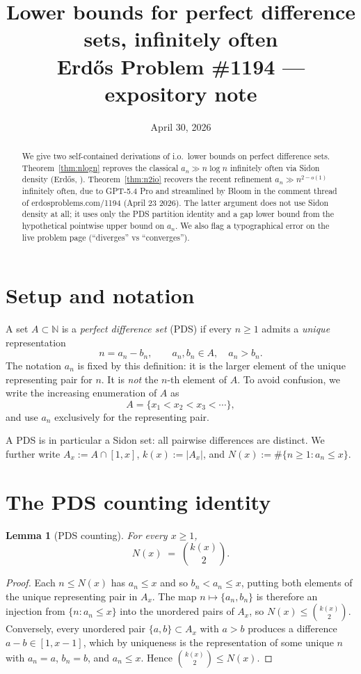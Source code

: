\documentclass[11pt]{article}
\title{Lower bounds for perfect difference sets, infinitely often \\
  \large Erd\H{o}s Problem \#1194 --- expository note}
\author{}
\date{April 30, 2026}
\newtheorem{lemma}{Lemma}
\begin{document}
\maketitle

\begin{abstract}
We give two self-contained derivations of i.o.\ lower bounds on
perfect difference sets. Theorem~\ref{thm:nlogn} reproves the classical
$a_n \gg n \log n$ infinitely often via Sidon density (Erd\H{o}s,
\cite{HaRo66}). Theorem~\ref{thm:n2io} recovers the recent refinement
$a_n \gg n^{2-o(1)}$ infinitely often, due to GPT-5.4 Pro and
streamlined by Bloom in the comment thread of erdosproblems.com/1194
(April 23 2026). The latter argument does not use Sidon density at all;
it uses only the PDS partition identity and a gap lower bound from
the hypothetical pointwise upper bound on $a_n$. We also flag a
typographical error on the live problem page (``diverges'' vs
``converges'').
\end{abstract}

\section{Setup and notation}\label{sec:setup}

A set $A \subset \mathbb{N}$ is a \emph{perfect difference set} (PDS) if
every $n \geq 1$ admits a \emph{unique} representation
\[
   n = a_n - b_n, \qquad a_n, b_n \in A, \quad a_n > b_n.
\]
The notation $a_n$ is fixed by this definition: it is the larger element
of the unique representing pair for $n$. It is \emph{not} the $n$-th
element of $A$. To avoid confusion, we write the increasing enumeration
of $A$ as
\[
   A = \{x_1 < x_2 < x_3 < \cdots\},
\]
and use $a_n$ exclusively for the representing pair.

A PDS is in particular a Sidon set: all pairwise differences are
distinct. We further write $A_x := A \cap [1, x]$, $k(x) := |A_x|$,
and $N(x) := \#\{n \geq 1 : a_n \leq x\}$.

\section{The PDS counting identity}\label{sec:counting}

\begin{lemma}[PDS counting]\label{lem:pds-count}
For every $x \geq 1$,
\[
   N(x) \;=\; \binom{k(x)}{2}.
\]
\end{lemma}

\begin{proof}
Each $n \leq N(x)$ has $a_n \leq x$ and so $b_n < a_n \leq x$, putting both
elements of the unique representing pair in $A_x$. The map
$n \mapsto \{a_n, b_n\}$ is therefore an injection from $\{n : a_n \leq x\}$
into the unordered pairs of $A_x$, so $N(x) \leq \binom{k(x)}{2}$.
Conversely, every unordered pair $\{a, b\} \subset A_x$ with $a > b$ produces
a difference $a - b \in [1, x-1]$, which by uniqueness is the representation
of some unique $n$ with $a_n = a$, $b_n = b$, and $a_n \leq x$. Hence
$\binom{k(x)}{2} \leq N(x)$.
\end{proof}
\end{document}
